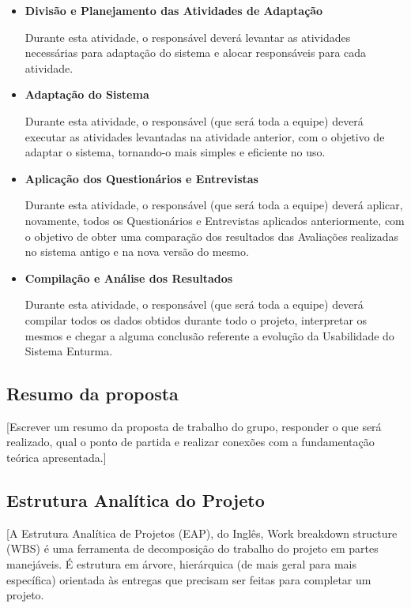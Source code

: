 \begin{itemize}
		\item \textbf{Divisão e Planejamento das Atividades de Adaptação}

			Durante esta atividade, o responsável deverá levantar as atividades necessárias para adaptação do sistema e alocar responsáveis para cada atividade.

		\item \textbf{Adaptação do Sistema}

			Durante esta atividade, o responsável (que será toda a equipe) deverá executar as atividades levantadas na atividade anterior, com o objetivo de adaptar o sistema, tornando-o mais simples e eficiente no uso.

		\item \textbf{Aplicação dos Questionários e Entrevistas}

			Durante esta atividade, o responsável (que será toda a equipe) deverá aplicar, novamente, todos os Questionários e Entrevistas aplicados anteriormente, com o objetivo de obter uma comparação dos resultados das Avaliações realizadas no sistema antigo e na nova versão do mesmo.

		\item \textbf{Compilação e Análise dos Resultados}

			Durante esta atividade, o responsável (que será toda a equipe) deverá compilar todos os dados obtidos durante todo o projeto, interpretar os mesmos e chegar a alguma conclusão referente a evolução da Usabilidade do Sistema Enturma.
	\end{itemize}

\subsection{Resumo da proposta}
	
	[Escrever um resumo da proposta de trabalho do grupo, responder o que será realizado, qual o ponto de partida e realizar conexões com a fundamentação teórica apresentada.]

\subsection{Estrutura Analítica do Projeto}
	
	[A Estrutura Analítica de Projetos (EAP), do Inglês, Work breakdown structure (WBS) é uma ferramenta de decomposição do trabalho do projeto em partes manejáveis. É estrutura em árvore, hierárquica (de mais geral para mais específica) orientada às entregas que precisam ser feitas para completar um projeto.

